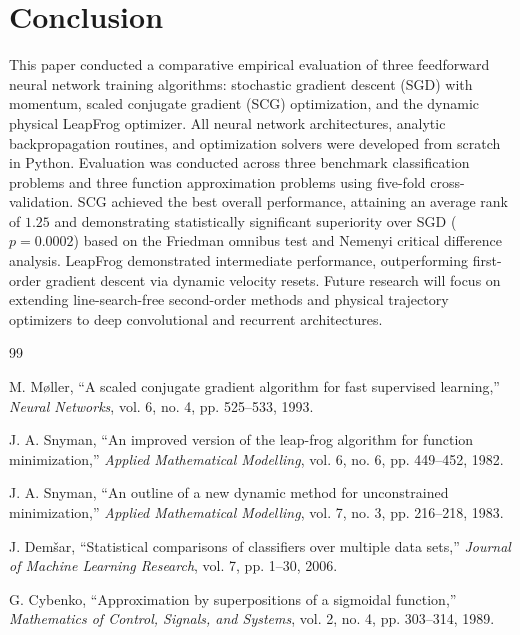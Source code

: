 \documentclass[10pt, conference]{IEEEtran}
\begin{document}
\section{Conclusion}

This paper conducted a comparative empirical evaluation of three feedforward neural network training algorithms: stochastic gradient descent (SGD) with momentum, scaled conjugate gradient (SCG) optimization, and the dynamic physical LeapFrog optimizer. All neural network architectures, analytic backpropagation routines, and optimization solvers were developed from scratch in Python. Evaluation was conducted across three benchmark classification problems and three function approximation problems using five-fold cross-validation. SCG achieved the best overall performance, attaining an average rank of $1.25$ and demonstrating statistically significant superiority over SGD ($p = 0.0002$) based on the Friedman omnibus test and Nemenyi critical difference analysis. LeapFrog demonstrated intermediate performance, outperforming first-order gradient descent via dynamic velocity resets. Future research will focus on extending line-search-free second-order methods and physical trajectory optimizers to deep convolutional and recurrent architectures.

\begin{thebibliography}{99}

M. Møller, ``A scaled conjugate gradient algorithm for fast supervised learning,'' \textit{Neural Networks}, vol. 6, no. 4, pp. 525--533, 1993.

J. A. Snyman, ``An improved version of the leap-frog algorithm for function minimization,'' \textit{Applied Mathematical Modelling}, vol. 6, no. 6, pp. 449--452, 1982.

J. A. Snyman, ``An outline of a new dynamic method for unconstrained minimization,'' \textit{Applied Mathematical Modelling}, vol. 7, no. 3, pp. 216--218, 1983.

J. Dem\v{s}ar, ``Statistical comparisons of classifiers over multiple data sets,'' \textit{Journal of Machine Learning Research}, vol. 7, pp. 1--30, 2006.

G. Cybenko, ``Approximation by superpositions of a sigmoidal function,'' \textit{Mathematics of Control, Signals, and Systems}, vol. 2, no. 4, pp. 303--314, 1989.
\end{thebibliography}
\end{document}
